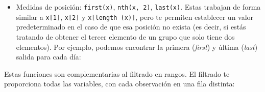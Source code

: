 \documentclass[11pt,oneside]{report}
\newenvironment{Shaded}{\begin{snugshade}}{\end{snugshade}}
\newcommand{\CommentTok}[1]{\textcolor[rgb]{0.56,0.35,0.01}{\textit{#1}}}
\newcommand{\DataTypeTok}[1]{\textcolor[rgb]{0.13,0.29,0.53}{#1}}
\newcommand{\KeywordTok}[1]{\textcolor[rgb]{0.13,0.29,0.53}{\textbf{#1}}}
\newcommand{\NormalTok}[1]{#1}
\newcommand{\OperatorTok}[1]{\textcolor[rgb]{0.81,0.36,0.00}{\textbf{#1}}}
\newcommand{\StringTok}[1]{\textcolor[rgb]{0.31,0.60,0.02}{#1}}
\providecommand{\tightlist}{%
  \setlength{\itemsep}{0pt}\setlength{\parskip}{0pt}}
\begin{document}
\begin{itemize}
\tightlist
\item
  Medidas de posición: \texttt{first(x)}, \texttt{nth(x,\ 2)},
  \texttt{last(x)}. Estas trabajan de forma similar a \texttt{x{[}1{]}},
  \texttt{x{[}2{]}} y \texttt{x{[}length\ (x){]}}, pero te permiten
  establecer un valor predeterminado en el caso de que esa posición no
  exista (es decir, si estás tratando de obtener el tercer elemento de
  un grupo que solo tiene dos elementos). Por ejemplo, podemos encontrar
  la primera (\emph{first}) y última (\emph{last}) salida para cada día:
\end{itemize}

\begin{Shaded}
\end{Shaded}

Estas funciones son complementarias al filtrado en rangos. El filtrado
te proporciona todas las variables, con cada observación en una fila
distinta:
\end{document}
